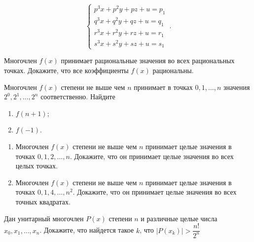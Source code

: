 \documentclass{article}
\begin{document}
\begin{enumerate_boxed}
        \[
            \begin{cases}
                p^{3}x+p^{2}y+pz+u = p_1\\
                q^{3}x+q^{2}y+qz+u = q_1\\
                r^{3}x+r^{2}y+rz+u = r_1\\
                s^{3}x+s^{2}y+sz+u = s_1
            \end{cases}\,.
        \]

        \item Многочлен $f(x)$ принимает рациональные значения во всех рациональных точках.
        Докажите, что все коэффициенты $f(x)$ рациональны.

        \item Многочлен $f(x)$ степени не выше чем $n$ принимает в точках $0, 1, \dotsc, n$ значения $2^0, 2^1, \dotsc, 2^n$ соответственно.
        Найдите

        \begin{enumerate}
            \item $f(n+1);$
            \item $f(-1).$
        \end{enumerate}
        \item
        \begin{enumerate}
            \item Многочлен $f(x)$ степени не выше чем $n$ принимает целые значения в точках $0, 1, 2, \dotsc, n$.
            Докажите, что он принимает целые значения во всех целых точках.
            \item Многочлен $f(x)$ степени не выше чем $n$ принимает целые значения в точках $0, 1, 4, \dotsc , n^2$.
            Докажите, что он принимает целые значения во всех точных квадратах.
        \end{enumerate}
        \item Дан унитарный многочлен $P(x)$ степени $n$ и различные целые числа $x_0, x_1, \dotsc, x_n$.
        Докажите, что найдется такое $k$, что $|P(x_k)| > \dfrac{n!}{2^n}$

    \end{enumerate_boxed}

    \begin{figure}[h]
        \label{fig:meme}
    \end{figure}
\end{document}
